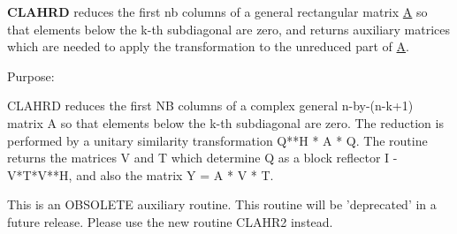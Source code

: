 {\bfseries C\+L\+A\+H\+R\+D} reduces the first nb columns of a general rectangular matrix \hyperlink{classA}{A} so that elements below the k-\/th subdiagonal are zero, and returns auxiliary matrices which are needed to apply the transformation to the unreduced part of \hyperlink{classA}{A}. 

 \begin{DoxyParagraph}{Purpose\+: }
\begin{DoxyVerb} CLAHRD reduces the first NB columns of a complex general n-by-(n-k+1)
 matrix A so that elements below the k-th subdiagonal are zero. The
 reduction is performed by a unitary similarity transformation
 Q**H * A * Q. The routine returns the matrices V and T which determine
 Q as a block reflector I - V*T*V**H, and also the matrix Y = A * V * T.

 This is an OBSOLETE auxiliary routine. 
 This routine will be 'deprecated' in a  future release.
 Please use the new routine CLAHR2 instead.\end{DoxyVerb}
 
\end{DoxyParagraph}


